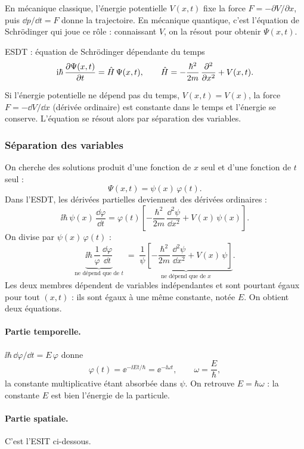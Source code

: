 En mécanique classique, l'énergie potentielle $V(x,t)$ fixe la force
$F=-\partial V/\partial x$, puis $\dd p/\dd t=F$ donne la trajectoire. En mécanique
quantique, c'est l'équation de Schrödinger qui joue ce rôle : connaissant $V$, on la
résout pour obtenir $\Psi(x,t)$.

\begin{resultat}{ESDT : équation de Schrödinger dépendante du temps}
\[
  \mathrm{i}\hbar\,\dfrac{\partial \Psi(x,t)}{\partial t} = \hat{H}\,\Psi(x,t),
  \qquad
  \hat{H} = -\frac{\hbar^2}{2m}\,\dfrac{\partial^{2} }{\partial x^{2}} + V(x,t).
\]
\end{resultat}

Si l'énergie potentielle ne dépend pas du temps, $V(x,t)=V(x)$, la force
$F=-\dd V/\dd x$ (dérivée ordinaire) est constante dans le temps et l'énergie se
conserve. L'équation se résout alors par séparation des variables.

\subsubsection{Séparation des variables}

On cherche des solutions produit d'une fonction de $x$ seul et d'une fonction de $t$
seul :
\[
  \Psi(x,t)=\psi(x)\,\varphi(t).
\]
Dans l'ESDT, les dérivées partielles deviennent des dérivées ordinaires :
\[
  \ii\hbar\,\psi(x)\,\frac{\dd\varphi}{\dd t}
  = \varphi(t)\left[-\frac{\hbar^2}{2m}\,\frac{\dd^2\psi}{\dd x^2}+V(x)\,\psi(x)\right].
\]
On divise par $\psi(x)\,\varphi(t)$ :
\[
  \underbrace{\ii\hbar\,\frac{1}{\varphi}\,\frac{\dd\varphi}{\dd t}}_{\text{ne dépend que de }t}
  \;=\;
  \underbrace{\frac{1}{\psi}\left[-\frac{\hbar^2}{2m}\,\frac{\dd^2\psi}{\dd x^2}+V(x)\,\psi\right]}_{\text{ne dépend que de }x}.
\]
Les deux membres dépendent de variables indépendantes et sont pourtant égaux pour
tout $(x,t)$ : ils sont égaux à une même constante, notée $E$. On obtient deux
équations.

\paragraph{Partie temporelle.} $\ii\hbar\,\dd\varphi/\dd t=E\,\varphi$ donne
\[
  \varphi(t)=\ee^{-\ii Et/\hbar}=\ee^{-\ii\omega t},
  \qquad \omega=\frac{E}{\hbar},
\]
la constante multiplicative étant absorbée dans $\psi$. On retrouve $E=\hbar\omega$ :
la constante $E$ est bien l'énergie de la particule.

\paragraph{Partie spatiale.} C'est l'ESIT ci-dessous.

